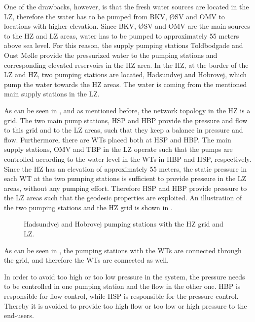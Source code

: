 One of the drawbacks, however, is that the fresh water sources are located in the LZ, therefore the water has to be pumped from BKV, ØSV and OMV to locations with higher elevation. Since BKV, ØSV and OMV are the main sources to the HZ and LZ areas, water has to be pumped to approximately 55 meters above sea level. For this reason, the supply pumping stations Toldbodgade and Oust Mølle provide the pressurized water to the pumping stations and corresponding elevated reservoirs in the HZ area. In the HZ, at the border of the LZ and HZ, two pumping stations are located, Hadsundvej and Hobrovej, which pump the water towards the HZ areas. The water is coming from the mentioned main supply stations in the LZ. 

As can be seen in , and as mentioned before, the network topology in the HZ is a grid. The two main pump stations, HSP and HBP provide the pressure and flow to this grid and to the LZ areas, such that they keep a balance in pressure and flow. Furthermore, there are WTs placed both at HSP and HBP. The main supply stations, OMV and TBP in the LZ operate such that the pumps are controlled according to the water level in the WTs in HBP and HSP, respectively. Since the HZ has an elevation of approximately 55 meters, the static pressure in each WT at the two pumping stations is sufficient to provide pressure in the LZ areas, without any pumping effort. Therefore HSP and HBP provide pressure to the LZ areas such that the geodesic properties are exploited. An illustration of the two pumping stations and the HZ grid is shown in . 

\begin{figure}[H]
\centering

\caption{Hadsundvej and Hobrovej pumping stations with the HZ grid and LZ.}
\label{fig:HBP_HSP_grid}
\end{figure}

\vspace{-3mm}

As can be seen in , the pumping stations with the WTs are connected through the grid, and therefore the WTs are connected as well.

In order to avoid too high or too low pressure in the system, the pressure needs to be controlled in one pumping station and the flow in the other one. HBP is responsible for flow control, while HSP is responsible for the pressure control. Thereby it is avoided to provide too high flow or too low or high pressure to the end-users. 

